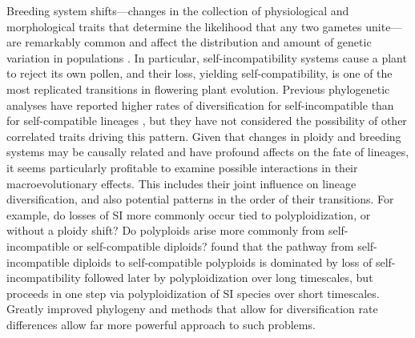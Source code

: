 Breeding system shifts---changes in the collection of physiological and morphological traits that determine the likelihood that any two gametes unite---are remarkably common and affect the distribution and amount of genetic variation in populations \citep{stebbins1974, barrett2013}.
In particular, self-incompatibility systems cause a plant to reject its own pollen, and their loss, yielding self-compatibility, is one of the most replicated transitions in flowering plant evolution. %
Previous phylogenetic analyses have reported higher rates of diversification for self-incompatible than for self-compatible lineages \citep{goldberg_2010, devos2014}, but they have not considered the possibility of other correlated traits driving this pattern.
Given that changes in ploidy and breeding systems may be causally related and have profound affects on the fate of lineages, it seems particularly profitable to examine possible interactions in their macroevolutionary effects.
This includes their joint influence on lineage diversification, and also potential patterns in the order of their transitions.
For example, do losses of SI more commonly occur tied to polyploidization, or without a ploidy shift?
Do polyploids arise more commonly from self-incompatible or self-compatible diploids?
 found that the pathway from self-incompatible diploids to self-compatible polyploids is dominated by loss of self-incompatibility followed later by polyploidization over long timescales, but proceeds in one step via polyploidization of SI species over short timescales.
Greatly improved phylogeny and methods that allow for diversification rate differences allow far more powerful approach to such problems. %

